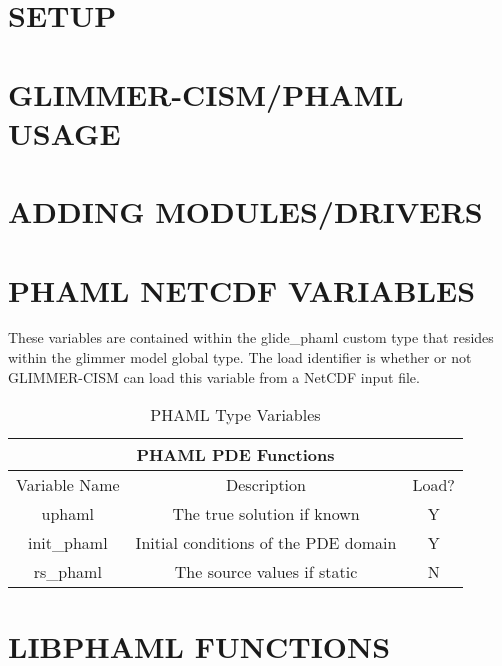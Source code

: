 

\appendixtitle
\appendix
\chapter{SETUP}\label{ch:setup}


\newpage
\chapter{GLIMMER-CISM/PHAML USAGE}\label{ch:usage}


\newpage
\chapter{ADDING MODULES/DRIVERS} \label{ch:addingmods}


\newpage
\chapter{PHAML NETCDF VARIABLES} \label{ch:phamlvars}

These variables are contained within the glide\_phaml custom type that resides within the glimmer model global type.  The load identifier is whether or not GLIMMER-CISM can load this variable from a NetCDF input file.

\begin{table}[ht]
\caption{PHAML Type Variables}
\centering
\begin{center}
    \begin{tabular}{ | c | c | c |}
    \hline
    \multicolumn{3}{|c|}{PHAML PDE Functions}\\
    \hline
    Variable Name & Description & Load?\\ \hline
    uphaml & The true solution if known & Y\\ \hline
    init\_phaml & Initial conditions of the PDE domain & Y\\ \hline
    rs\_phaml & The source values if static & N \\ \hline
\end{tabular}
\end{center}
\end{table}

\newpage
\chapter{LIBPHAML FUNCTIONS} \label{ch:libphamlfunc}

%

